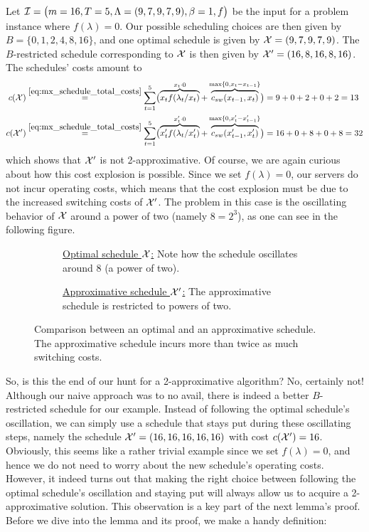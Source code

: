 \begin{exmpl}\label{exmpl:oscillating_schedule}
Let $\mathcal{I}=\bigl(m=16,T=5,\Lambda=(9,7,9,7,9),\beta=1,f\bigr)$ be the input for a problem instance where $f(\lambda)=0$. Our possible scheduling choices are then given by $B=\{0,1,2,4,8,16\}$, and one optimal schedule is given by $\mathcal{X}=(9,7,9,7,9)$. The $B$-restricted schedule corresponding to $\mathcal{X}$ is then given by $\mathcal{X}'=(16,8,16,8,16)$. The schedules' costs amount to
\begin{align*}
	c(\mathcal{X})&\stackrel{\eqref{eq:mx_schedule_total_costs}}{=}\sum\limits_{t=1}^{5}\bigl(\overbrace{x_tf(\lambda_t/x_t)}^{x_t\cdot 0}+\overbrace{c_{sw}(x_{t-1},x_t)}^{\max\{0,x_t-x_{t-1}\}}\bigr)=9+0+2+0+2=13\\
	c(\mathcal{X}')&\stackrel{\eqref{eq:mx_schedule_total_costs}}{=}\sum\limits_{t=1}^{5}\bigl(\overbrace{x_t'f(\lambda_t/x_t')}^{x_t'\cdot 0}+\overbrace{c_{sw}(x_{t-1}',x_t')}^{\max\{0,x_t'-x_{t-1}'\}}\bigr)=16+0+8+0+8=32
\end{align*}
which shows that $\mathcal{X}'$ is not 2-approximative. Of course, we are again curious about how this cost explosion is possible. Since we set $f(\lambda)=0$, our servers do not incur operating costs, which means that the cost explosion must be due to the increased switching costs of $\mathcal{X}'$. The problem in this case is the oscillating behavior of $\mathcal{X}$ around a power of two (namely $8=2^3$), as one can see in the following figure. 
\begin{figure}[H]
\captionsetup[subfigure]{labelformat=empty}
\begin{subfigure}[b]{0.48\textwidth}

	\caption{\underline{Optimal schedule $\mathcal{X}$:} Note how the schedule oscillates around 8 (a power of two).}
\end{subfigure}
\hfill
\begin{subfigure}[b]{0.48\textwidth}

	\caption{\underline{Approximative schedule $\mathcal{X}'$:} The approximative schedule is restricted to powers of two.}
\end{subfigure}
\caption{Comparison between an optimal and an approximative schedule. The approximative schedule incurs more than twice as much switching costs.}
\label{fig:adaption-schedule}
\end{figure}
\end{exmpl}
So, is this the end of our hunt for a 2-approximative algorithm? No, certainly not! Although our naive approach was to no avail, there is indeed a better $B$-restricted schedule for our example. Instead of following the optimal schedule's oscillation, we can simply use a schedule that stays put during these oscillating steps, namely the schedule $\mathcal{X}'=(16,16,16,16,16)$ with cost $c(\mathcal{X}')=16$. Obviously, this seems like a rather trivial example since we set $f(\lambda)=0$, and hence we do not need to worry about the new schedule's operating costs. However, it indeed turns out that making the right choice between following the optimal schedule's oscillation and staying put will always allow us to acquire a 2-approximative solution. This observation is a key part of the next lemma's proof. Before we dive into the lemma and its proof, we make a handy definition:
